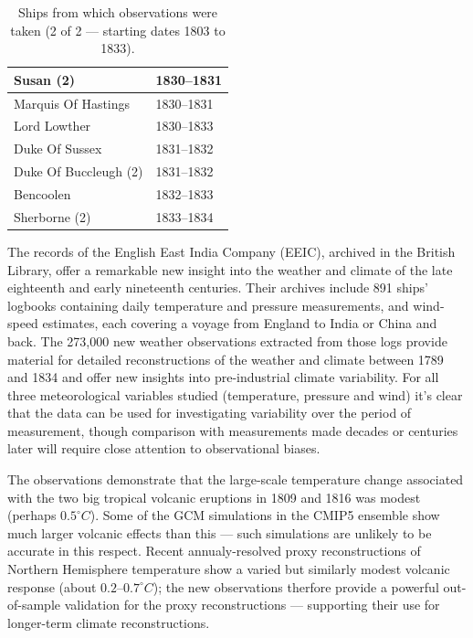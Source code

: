 \documentclass[CP]{copernicus}
\begin{document}
\begin{table}[!hbp]
\begin{minipage}[b]{0.5\linewidth}
{\begin{tabular}{|p{3.5cm}|p{3.5cm}|}
\hline
Susan (2) & 1830--1831\\
\hline
Marquis Of Hastings & 1830--1831\\
\hline
Lord Lowther & 1830--1833\\
\hline
Duke Of Sussex & 1831--1832\\
\hline
Duke Of Buccleugh (2) & 1831--1832\\
\hline
Bencoolen & 1832--1833\\
\hline
Sherborne (2) & 1833--1834\\
\hline
\end{tabular}
}
\end{minipage}
\vspace{0.5cm}
\caption{Ships from which observations were taken (2 of 2 --- starting dates 1803 to 1833).}
\label{T1.2}
\end{table}


\conclusions

The records of the English East India Company (EEIC), archived in the British Library, offer a remarkable new insight into the weather and climate of the late eighteenth and early nineteenth centuries. Their archives include 891 ships' logbooks containing daily temperature and pressure measurements, and wind-speed estimates, each covering a voyage from England to India or China and back. The 273,000 new weather observations extracted from those logs provide material for detailed reconstructions of the weather and climate between 1789 and 1834 and offer new insights into pre-industrial climate variability. For all three meteorological variables studied (temperature, pressure and wind) it's clear that the data can be used for investigating variability over the period of measurement, though comparison with measurements made decades or centuries later will require close attention to observational biases.

The observations demonstrate that the large-scale temperature change associated with the two big tropical volcanic eruptions in 1809 and 1816 was modest (perhaps $0.5^\circ C$). Some of the GCM simulations in the CMIP5 ensemble show much larger volcanic effects than this --- such simulations are unlikely to be accurate in this respect. Recent annualy-resolved proxy reconstructions of Northern Hemisphere temperature show a varied but similarly modest volcanic response (about $0.2$--$0.7^\circ C$); the new observations therfore provide a powerful out-of-sample validation for the proxy reconstructions --- supporting their use for longer-term climate reconstructions.
\end{document}
